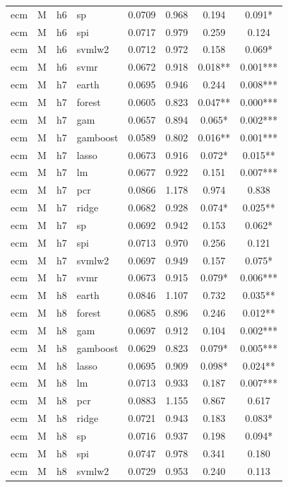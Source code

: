 \begin{ThreePartTable}
\begin{longtable}[t]{llclcccc}
ecm & M & h6 & sp & 0.0709 & 0.968 & 0.194 & 0.091*\\
ecm & M & h6 & spi & 0.0717 & 0.979 & 0.259 & 0.124\\
ecm & M & h6 & svmlw2 & 0.0712 & 0.972 & 0.158 & 0.069*\\
ecm & M & h6 & svmr & 0.0672 & 0.918 & 0.018** & 0.001***\\
\addlinespace
ecm & M & h7 & earth & 0.0695 & 0.946 & 0.244 & 0.008***\\
ecm & M & h7 & forest & 0.0605 & 0.823 & 0.047** & 0.000***\\
ecm & M & h7 & gam & 0.0657 & 0.894 & 0.065* & 0.002***\\
ecm & M & h7 & gamboost & 0.0589 & 0.802 & 0.016** & 0.001***\\
ecm & M & h7 & lasso & 0.0673 & 0.916 & 0.072* & 0.015**\\
ecm & M & h7 & lm & 0.0677 & 0.922 & 0.151 & 0.007***\\
ecm & M & h7 & pcr & 0.0866 & 1.178 & 0.974 & 0.838\\
ecm & M & h7 & ridge & 0.0682 & 0.928 & 0.074* & 0.025**\\
ecm & M & h7 & sp & 0.0692 & 0.942 & 0.153 & 0.062*\\
ecm & M & h7 & spi & 0.0713 & 0.970 & 0.256 & 0.121\\
ecm & M & h7 & svmlw2 & 0.0697 & 0.949 & 0.157 & 0.075*\\
ecm & M & h7 & svmr & 0.0673 & 0.915 & 0.079* & 0.006***\\
\addlinespace
ecm & M & h8 & earth & 0.0846 & 1.107 & 0.732 & 0.035**\\
ecm & M & h8 & forest & 0.0685 & 0.896 & 0.246 & 0.012**\\
ecm & M & h8 & gam & 0.0697 & 0.912 & 0.104 & 0.002***\\
ecm & M & h8 & gamboost & 0.0629 & 0.823 & 0.079* & 0.005***\\
ecm & M & h8 & lasso & 0.0695 & 0.909 & 0.098* & 0.024**\\
ecm & M & h8 & lm & 0.0713 & 0.933 & 0.187 & 0.007***\\
ecm & M & h8 & pcr & 0.0883 & 1.155 & 0.867 & 0.617\\
ecm & M & h8 & ridge & 0.0721 & 0.943 & 0.183 & 0.083*\\
ecm & M & h8 & sp & 0.0716 & 0.937 & 0.198 & 0.094*\\
ecm & M & h8 & spi & 0.0747 & 0.978 & 0.341 & 0.180\\
ecm & M & h8 & svmlw2 & 0.0729 & 0.953 & 0.240 & 0.113\\

\end{longtable}
\end{ThreePartTable}
